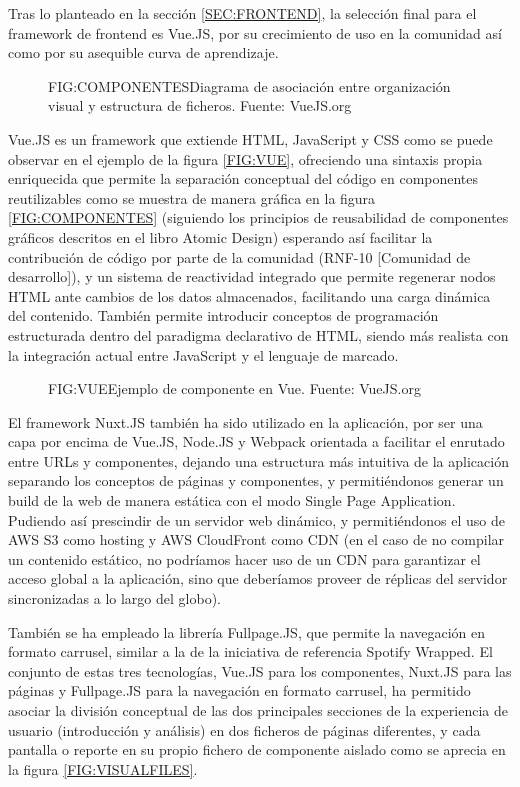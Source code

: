 
Tras lo planteado en la sección \ref{SEC:FRONTEND}, la selección final para el framework de frontend es Vue.JS, por su crecimiento de uso en la comunidad así como por su asequible curva de aprendizaje.

\begin{figure}[Division por componentes]{FIG:COMPONENTES}{Diagrama de asociación entre organización visual y estructura de ficheros. Fuente: VueJS.org}
\end{figure}

Vue.JS es un framework que extiende HTML, JavaScript y CSS\cite{VueJS} como se puede observar en el ejemplo de la figura \ref{FIG:VUE}, ofreciendo una sintaxis propia enriquecida que permite la separación conceptual del código en componentes reutilizables como se muestra de manera gráfica en la figura \ref{FIG:COMPONENTES} (siguiendo los principios de reusabilidad de componentes gráficos descritos en el libro Atomic Design\cite{AtomicDesign}) esperando así facilitar la contribución de código por parte de la comunidad (RNF-10 [Comunidad de desarrollo]), y un sistema de reactividad integrado que permite regenerar nodos HTML ante cambios de los datos almacenados, facilitando una carga dinámica del contenido. También permite introducir conceptos de programación estructurada dentro del paradigma declarativo de HTML, siendo más realista con la integración actual entre JavaScript y el lenguaje de marcado. 

\begin{figure}[Ejemplo de componente en Vue]{FIG:VUE}{Ejemplo de componente en Vue. Fuente: VueJS.org}
\end{figure}

El framework Nuxt.JS también ha sido utilizado en la aplicación, por ser una capa por encima de Vue.JS, Node.JS y Webpack orientada a facilitar el enrutado entre URLs y componentes\cite{NuxtJS}, dejando una estructura más intuitiva de la aplicación separando los conceptos de páginas y componentes, y permitiéndonos generar un build de la web de manera estática con el modo Single Page Application. Pudiendo así prescindir de un servidor web dinámico, y permitiéndonos el uso de AWS S3 como hosting y AWS CloudFront como CDN (en el caso de no compilar un contenido estático, no podríamos hacer uso de un CDN para garantizar el acceso global a la aplicación, sino que deberíamos proveer de réplicas del servidor sincronizadas a lo largo del globo).

También se ha empleado la librería Fullpage.JS, que permite la navegación en formato carrusel\cite{FullpageJS}, similar a la de la iniciativa de referencia Spotify Wrapped. El conjunto de estas tres tecnologías, Vue.JS para los componentes, Nuxt.JS para las páginas y Fullpage.JS para la navegación en formato carrusel, ha permitido asociar la división conceptual de las dos principales secciones de la experiencia de usuario (introducción y análisis) en dos ficheros de páginas diferentes, y cada pantalla o reporte en su propio fichero de componente aislado como se aprecia en la figura \ref{FIG:VISUALFILES}.


